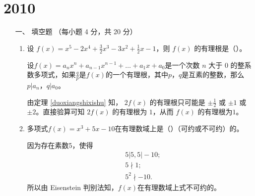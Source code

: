 \section{2010}
\begin{enumerate}[1~]
\renewcommand{\labelenumi}{\textbf{\theenumi. }}
\renewcommand{\Im}{\text{Im }}
\item[一、]
填空题 （每小题 4 分，共 20 分）
\begin{enumerate}[1.~]
\item
设 $f ( x ) = x ^ { 5 } - 2 x ^ { 4 } + \frac { 3 } { 2 } x ^ { 3 } - 3 x ^ { 2 } + \frac { 1 } { 2 } x - 1$，则 $f(x)$ 的有理根是（\quad）。

\begin{solution}
\begin{theorem}\label{duoxiangshixishu}
设$f ( x ) = a _ { n } x ^ { n } + a _ { n - 1 } x ^ { n - 1 } + \dots + a _ { 1 } x + a _ { 0 }$是一个次数 $n$ 大于 $0$ 的整系数多项式，如果$\frac{q}{p}$是$f(x)$的一个有理根，其中$p$，$q$是互素的整数，那么$p|a_n$，$q|a_0$。
\end{theorem}

由定理 \eqref{duoxiangshixishu} 知， $2f(x)$ 的有理根只可能是 $\pm\frac12$ 或 $\pm1$ 或 $\pm2$。直接验算可知 $2f(x)$ 的有理根为 $1$，从而 $f(x)$ 的有理根为$1$。
 \end{solution}
 
\item
多项式$ f(x) = x^3 + 5x − 10 $在有理数域上是（\quad）（可约或不可约）的。

\begin{solution}
因为存在素数5，使得\begin{align*}
&5|5, 5|-10;\\
&5\nmid 1;\\
&5^2\nmid -10.
\end{align*}
所以由 Eisenstein 判别法知，$f(x)$在有理数域上式不可约的。
\end{solution}


\end{enumerate}
\end{enumerate}
